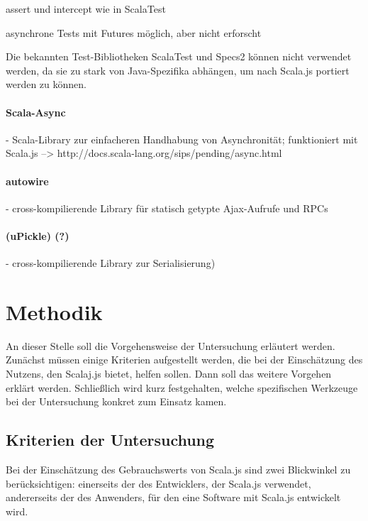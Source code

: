 \documentclass[a4paper, 12pt, hidelinks, listof=totoc, listoftables=totoc, bibliography=totoc]{scrreprt}
\begin{document}
assert und intercept wie in ScalaTest


asynchrone Tests mit Futures möglich, aber nicht erforscht

Die bekannten Test-Bibliotheken ScalaTest und Specs2 können nicht verwendet werden, da sie zu stark von Java-Spezifika abhängen, um nach Scala.js portiert werden zu können\cite[\#OtherTestingLibraries]{haoyi.HOS}.


\subsubsection{Scala-Async}

- Scala-Library zur einfacheren Handhabung von Asynchronität; funktioniert mit Scala.js -->  http://docs.scala-lang.org/sips/pending/async.html

\subsubsection{autowire}

- cross-kompilierende Library für statisch getypte Ajax-Aufrufe und RPCs

\subsubsection{(uPickle) (?)}

- cross-kompilierende Library zur Serialisierung)






\chapter{Methodik}\label{chap:methods}

An dieser Stelle soll die Vorgehensweise der Untersuchung erläutert werden. Zunächst müssen einige Kriterien aufgestellt werden, die bei der Einschätzung des Nutzens, den Scalaj.js bietet, helfen sollen. Dann soll das weitere Vorgehen erklärt werden. Schließlich wird kurz festgehalten, welche spezifischen Werkzeuge bei der Untersuchung konkret zum Einsatz kamen.

\section{Kriterien der Untersuchung}

Bei der Einschätzung des Gebrauchswerts von Scala.js sind zwei Blickwinkel zu berücksichtigen: einerseits der des Entwicklers, der Scala.js verwendet, andererseits der des Anwenders, für den eine Software mit Scala.js entwickelt wird.
\end{document}
